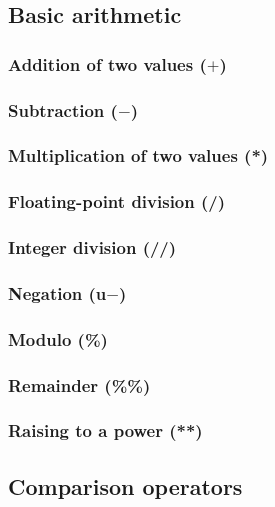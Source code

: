 \documentclass{article}
\theoremstyle{definition}
\begin{document}
\subsection{Basic arithmetic}

\subsubsection{Addition of two values ($+$)}
\libfcn{+}

\subsubsection{Subtraction ($-$)}
\libfcn{-}

\subsubsection{Multiplication of two values (*)}
\libfcn{*}

\subsubsection{Floating-point division (/)}
\libfcn{/}

\subsubsection{Integer division (//)}
\libfcn{//}

\subsubsection{Negation (u$-$)}

\subsubsection{Modulo (\%)}
\libfcn{\%}

\subsubsection{Remainder (\%\%)}
\libfcn{\%\%}

\subsubsection{Raising to a power (**)}
\libfcn{**}

\subsection{Comparison operators}
\end{document}
